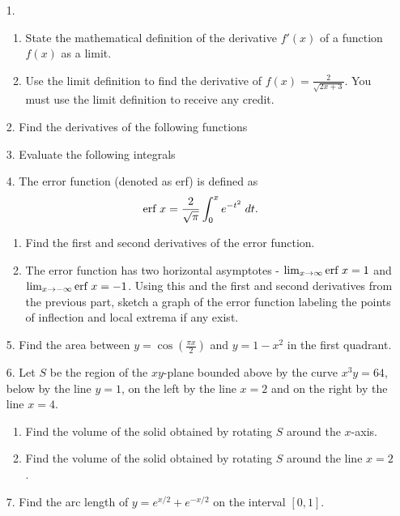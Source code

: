 \documentclass[11pt,reqno]{article}
\theoremstyle{definition}
\begin{document}
	\begin{enumerate}
		\item[1.] 
		\begin{enumerate}
			
			\item State the mathematical definition of the derivative $f'(x)$ of a function $f(x)$ as a limit.
			
			\vspace{1.5in}
			
			\item Use the limit definition to find the derivative of $f(x)=\frac{2}{\sqrt{2x+3}}$. You must use the limit definition to receive any credit.
			
		\end{enumerate}
		\newpage
		\item[2.] Find the derivatives of the following functions
		\newpage
		\item[3.] Evaluate the following integrals
		\newpage
		\item[4.] The error function (denoted as erf) is defined as $$\textnormal{erf }x = \frac{2}{\sqrt{\pi}} \int_{0}^{x} e^{-t^2} \; dt.$$ 
		\begin{enumerate}
			\item Find the first and second derivatives of the error function.
			\vspace{5cm}
			\item The error function has two horizontal asymptotes - $\lim_{x \to \infty} \textnormal{erf } x = 1$ and $\lim_{x \to -\infty} \textnormal{erf } x = -1$. Using this and the first and second derivatives from the previous part, sketch a graph of the error function labeling the points of inflection and local extrema if any exist.
		\end{enumerate}
		\newpage
		\item[5.] Find the area between $y = \cos\left(\frac{\pi x}{2}\right)$ and $y = 1 - x^2$ in the first quadrant. 
		\newpage
		\item[6.] Let $S$ be the region of the $xy$-plane bounded above by the curve $x^3y = 64$, below by the line $y = 1$, on the left by the line $x = 2$ and on the right by the line $x = 4$. 
		\begin{enumerate}
			\item Find the volume of the solid obtained by rotating $S$ around the $x$-axis. 
			\vspace{8cm}
			\item Find the volume of the solid obtained by rotating $S$ around the line $x = 2$. 
		\end{enumerate}
		\newpage
		\item[7.] Find the arc length of $y = e^{x/2} + e^{-x/2}$ on the interval $[0, 1]$. 
		

\end{enumerate}
\end{document}
